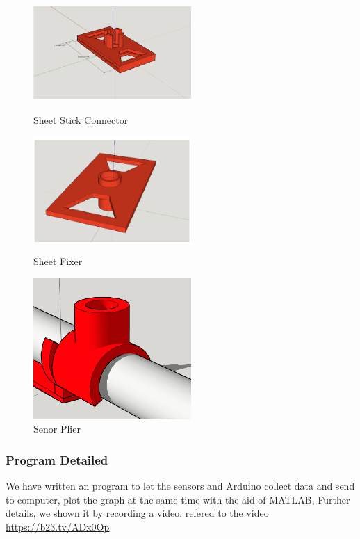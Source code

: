 \documentclass[12pt]{article}
\numberwithin{equation}{section}
\begin{document}
\begin{figure}[htbp]
\centering
\begin{minipage}[t]{0.3\textwidth}
\centering
\includegraphics[width=6cm]{connector.png}
\caption{Sheet Stick Connector}
\label{connector}
\end{minipage}
\begin{minipage}[t]{0.3\textwidth}
\centering
\includegraphics[width=6cm]{fixer.png}
\caption{Sheet Fixer}
\label{fixer}
\end{minipage}
\begin{minipage}[t]{0.3\textwidth}
\centering
\includegraphics[width=6cm]{plier.png}
\caption{Senor Plier}
\label{plier}
\end{minipage}
\end{figure}



\subsubsection{Program Detailed}

We have written an program to let the sensors and Arduino collect data and send to computer, plot the graph at the same time with the aid of MATLAB, Further details, we shown it by recording a video. refered to the video \href{https://b23.tv/ADx0Op}{https://b23.tv/ADx0Op} 
\end{document}
